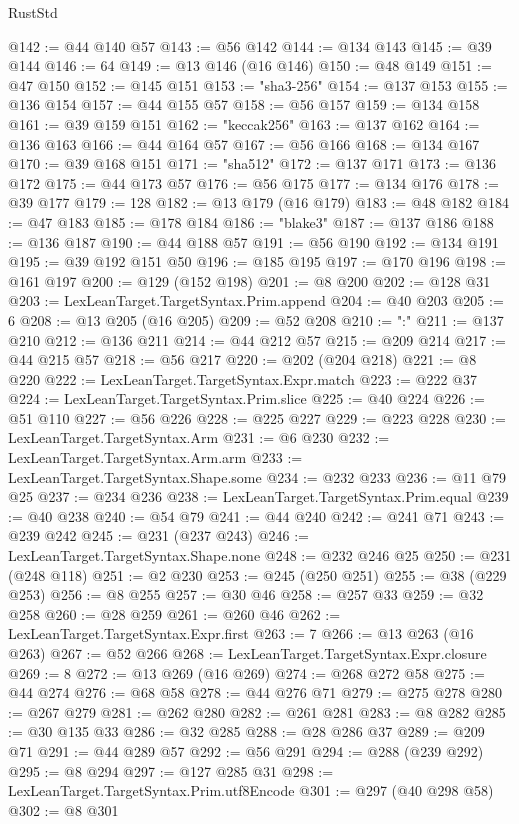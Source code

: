 \begin{lexlean}{RustStd}
\begin{coremodule}
{\begin{coremodule}
{{{{{{{{{{{{{{{@142 := @44 @140 @57
@143 := @56 @142
@144 := @134 @143
@145 := @39 @144
@146 := 64
@149 := @13 @146 (@16 @146)
@150 := @48 @149
@151 := @47 @150
@152 := @145 @151
@153 := "sha3-256"
@154 := @137 @153
@155 := @136 @154
@157 := @44 @155 @57
@158 := @56 @157
@159 := @134 @158
@161 := @39 @159 @151
@162 := "keccak256"
@163 := @137 @162
@164 := @136 @163
@166 := @44 @164 @57
@167 := @56 @166
@168 := @134 @167
@170 := @39 @168 @151
@171 := "sha512"
@172 := @137 @171
@173 := @136 @172
@175 := @44 @173 @57
@176 := @56 @175
@177 := @134 @176
@178 := @39 @177
@179 := 128
@182 := @13 @179 (@16 @179)
@183 := @48 @182
@184 := @47 @183
@185 := @178 @184
@186 := "blake3"
@187 := @137 @186
@188 := @136 @187
@190 := @44 @188 @57
@191 := @56 @190
@192 := @134 @191
@195 := @39 @192 @151 @50
@196 := @185 @195
@197 := @170 @196
@198 := @161 @197
@200 := @129 (@152 @198)
@201 := @8 @200
@202 := @128 @31
@203 := LexLeanTarget.TargetSyntax.Prim.append
@204 := @40 @203
@205 := 6
@208 := @13 @205 (@16 @205)
@209 := @52 @208
@210 := ":"
@211 := @137 @210
@212 := @136 @211
@214 := @44 @212 @57
@215 := @209 @214
@217 := @44 @215 @57
@218 := @56 @217
@220 := @202 (@204 @218)
@221 := @8 @220
@222 := LexLeanTarget.TargetSyntax.Expr.match
@223 := @222 @37
@224 := LexLeanTarget.TargetSyntax.Prim.slice
@225 := @40 @224
@226 := @51 @110
@227 := @56 @226
@228 := @225 @227
@229 := @223 @228
@230 := LexLeanTarget.TargetSyntax.Arm
@231 := @6 @230
@232 := LexLeanTarget.TargetSyntax.Arm.arm
@233 := LexLeanTarget.TargetSyntax.Shape.some
@234 := @232 @233
@236 := @11 @79 @25
@237 := @234 @236
@238 := LexLeanTarget.TargetSyntax.Prim.equal
@239 := @40 @238
@240 := @54 @79
@241 := @44 @240
@242 := @241 @71
@243 := @239 @242
@245 := @231 (@237 @243)
@246 := LexLeanTarget.TargetSyntax.Shape.none
@248 := @232 @246 @25
@250 := @231 (@248 @118)
@251 := @2 @230
@253 := @245 (@250 @251)
@255 := @38 (@229 @253)
@256 := @8 @255
@257 := @30 @46
@258 := @257 @33
@259 := @32 @258
@260 := @28 @259
@261 := @260 @46
@262 := LexLeanTarget.TargetSyntax.Expr.first
@263 := 7
@266 := @13 @263 (@16 @263)
@267 := @52 @266
@268 := LexLeanTarget.TargetSyntax.Expr.closure
@269 := 8
@272 := @13 @269 (@16 @269)
@274 := @268 @272 @58
@275 := @44 @274
@276 := @68 @58
@278 := @44 @276 @71
@279 := @275 @278
@280 := @267 @279
@281 := @262 @280
@282 := @261 @281
@283 := @8 @282
@285 := @30 @135 @33
@286 := @32 @285
@288 := @28 @286 @37
@289 := @209 @71
@291 := @44 @289 @57
@292 := @56 @291
@294 := @288 (@239 @292)
@295 := @8 @294
@297 := @127 @285 @31
@298 := LexLeanTarget.TargetSyntax.Prim.utf8Encode
@301 := @297 (@40 @298 @58)
@302 := @8 @301
}}}}}}}}}}}}}}}
\end{coremodule}}
\end{coremodule}
\end{lexlean}
